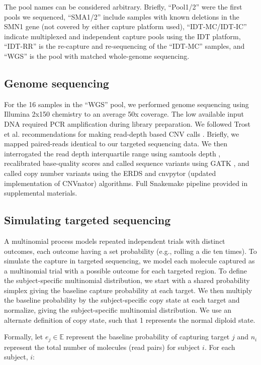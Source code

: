 \documentclass{bmcart}\usepackage[]{graphicx}\usepackage[]{color}
\begin{document}
The pool names can be considered arbitrary.
Briefly, ``Pool1/2'' were the first pools we sequenced, ``SMA1/2'' include samples with known deletions in the SMN1 gene (not covered by either capture platform used), ``IDT-MC/IDT-IC'' indicate multiplexed and independent capture pools using the IDT platform, ``IDT-RR'' is the re-capture and re-sequencing of the ``IDT-MC'' samples, and ``WGS'' is the pool with matched whole-genome sequencing.

\subsection{Genome sequencing}

For the 16 samples in the ``WGS'' pool, we performed genome sequencing using Illumina 2x150 chemistry to an average 50x coverage.
The low available input DNA required PCR amplification during library preparation.
We followed Trost et al. recommendations for making read-depth based CNV calls \cite{trost:2018aa}.
Briefly, we mapped paired-reads identical to our targeted sequencing data.
We then interrogated the read depth interquartile range using samtools depth \cite{li:2009aa}, recalibrated base-quality scores and called sequence variants using GATK \cite{van-der-auwera:2013aa}, and called copy number variants using the ERDS \cite{zhu:2012aa} and cnvpytor (updated implementation of CNVnator) \cite{abyzov:2011aa} algorithms.
Full Snakemake \cite{koster:2012aa} pipeline provided in supplemental materials.

\subsection{Simulating targeted sequencing}

A multinomial process models repeated independent trials with distinct outcomes, each outcome having a set probability (e.g., rolling a die ten times).
To simulate the capture in targeted sequencing, we model each molecule captured as a multinomial trial with a possible outcome for each targeted region.
To define the subject-specific multinomial distribution, we start with a shared probability simplex giving the baseline capture probability at each target.
We then multiply the baseline probability by the subject-specific copy state at each target and normalize, giving the subject-specific multinomial distribution.
We use an alternate definition of copy state, such that 1 represents the normal diploid state.

Formally, let $e_j \in \mathbb{E}$ represent the baseline probability of capturing target $j$ and $n_i$ represent the total number of molecules (read pairs) for subject $i$.
For each subject, $i$:
\end{document}
